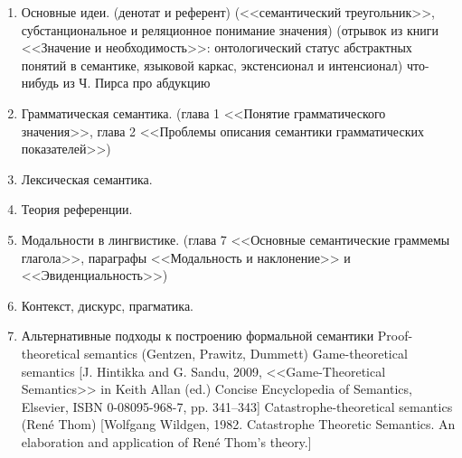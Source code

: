 \documentclass[a4paper,12pt]{article}
\begin{document}
\begin{enumerate}
  \item Основные идеи. 
     (денотат и референт)
     (<<семантический треугольник>>, субстанциональное и реляционное понимание значения)
     (отрывок из книги <<Значение и необходимость>>: онтологический статус абстрактных понятий в семантике, языковой каркас, экстенсионал и интенсионал)
    \subitem что-нибудь из Ч. Пирса про абдукцию
  \item Грамматическая семантика. 
     (глава 1 <<Понятие грамматического значения>>, глава 2 <<Проблемы описания семантики грамматических показателей>>)
  \item Лексическая семантика. 
  \item Теория референции. 
  \item Модальности в лингвистике. 
     (глава 7 <<Основные семантические граммемы глагола>>, параграфы <<Модальность и наклонение>> и <<Эвиденциальность>>)
  \item Контекст, дискурс, прагматика. 
  \item Альтернативные подходы к построению формальной семантики
    \subitem Proof-theoretical semantics (Gentzen, Prawitz, Dummett)
    \subitem Game-theoretical semantics [J. Hintikka and G. Sandu, 2009, <<Game-Theoretical Semantics>> in Keith Allan (ed.) Concise Encyclopedia of Semantics, Elsevier, ISBN 0-08095-968-7, pp. 341–343]
    \subitem Catastrophe-theoretical semantics (Ren\'{e} Thom) [Wolfgang Wildgen, 1982. Catastrophe Theoretic Semantics. An elaboration and application of Ren\'{e} Thom's theory.]
\end{enumerate}
\end{document}
